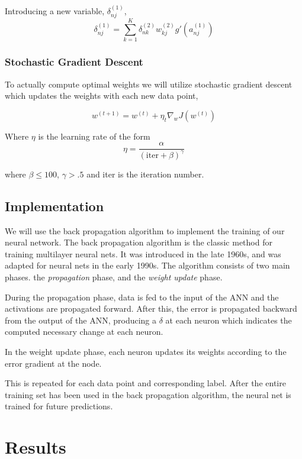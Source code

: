 \documentclass[12pt, twocolumn]{article}
\begin{document}
Introducing a new variable, $\delta_{nj}^{(1)}$, 
\begin{equation}
\delta_{nj}^{(1)} = \sum_{k=1}^K    \delta_{nk}^{(2)} w_{kj}^{(2)} g'(a_{nj}^{(1)})
\end{equation}

\subsubsection{Stochastic Gradient Descent}
To actually compute optimal weights we will utilize stochastic gradient descent which updates the weights with each new data point,

\begin{equation}
w^{(t+1)} = w^{(t)} + \eta_t \nabla_w J(w^{(t)})
\end{equation}

Where $\eta$ is the learning rate of the form 
\begin{equation}
\eta = \frac{ \alpha}{ (\textrm{iter} + \beta)^\gamma}
\end{equation}

where $\beta \leq 100$, $\gamma >.5$ and iter is the iteration number. 


\subsection{Implementation}
We will use the back propagation algorithm to implement the training of our neural network. The back propagation algorithm is the classic method for training multilayer neural nets. It was introduced in the late 1960s, and was adapted for neural nets in the early 1990s. The algorithm consists of two main phases. the \textit{propagation} phase, and the \textit{weight update} phase.

During the propagation phase, data is fed to the input of the ANN and the activations are propagated forward. After this, the error is propagated backward from the output of the ANN, producing a $\delta$ at each neuron which indicates the computed necessary change at each neuron.

In the weight update phase, each neuron updates its weights according to the error gradient at the node.

This is repeated for each data point and corresponding label. After the entire training set has been used in the back propagation algorithm, the neural net is trained for future predictions.

\section{Results}
\end{document}
